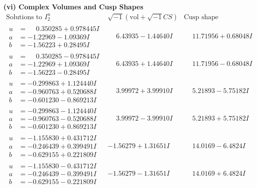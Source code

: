 \documentclass[1p]{elsarticle_modified}
\theoremstyle{definition}
\newcommand{\I}{\sqrt{-1}}
\begin{document}
\newpage\flushleft \textbf{(vi) Complex Volumes and Cusp Shapes}
$$\begin{array}{c|c|c}  
\text{Solutions to }I^u_{2}& \I (\text{vol} + \sqrt{-1}CS) & \text{Cusp shape}\\
 \hline 
\begin{aligned}
u &= \phantom{-}0.350285 + 0.978445 I \\
a &= -1.22969 - 1.09369 I \\
b &= -1.56223 + 0.28495 I\end{aligned}
 & \phantom{-}6.43935 - 1.44640 I & \phantom{-}11.71956 + 0.68048 I \\ \hline\begin{aligned}
u &= \phantom{-}0.350285 - 0.978445 I \\
a &= -1.22969 + 1.09369 I \\
b &= -1.56223 - 0.28495 I\end{aligned}
 & \phantom{-}6.43935 + 1.44640 I & \phantom{-}11.71956 - 0.68048 I \\ \hline\begin{aligned}
u &= -0.299863 + 1.124440 I \\
a &= -0.960763 + 0.520688 I \\
b &= -0.601230 - 0.869213 I\end{aligned}
 & \phantom{-}3.99972 + 3.99910 I & \phantom{-}5.21893 - 5.75182 I \\ \hline\begin{aligned}
u &= -0.299863 - 1.124440 I \\
a &= -0.960763 - 0.520688 I \\
b &= -0.601230 + 0.869213 I\end{aligned}
 & \phantom{-}3.99972 - 3.99910 I & \phantom{-}5.21893 + 5.75182 I \\ \hline\begin{aligned}
u &= -1.155830 + 0.431712 I \\
a &= -0.246439 + 0.399491 I \\
b &= -0.629155 + 0.221809 I\end{aligned}
 & -1.56279 + 1.31651 I & \phantom{-}14.0169 - 6.4824 I \\ \hline\begin{aligned}
u &= -1.155830 - 0.431712 I \\
a &= -0.246439 - 0.399491 I \\
b &= -0.629155 - 0.221809 I\end{aligned}
 & -1.56279 - 1.31651 I & \phantom{-}14.0169 + 6.4824 I \\ \hline\begin{aligned}

\end{aligned}
\end{array}$$
\end{document}
